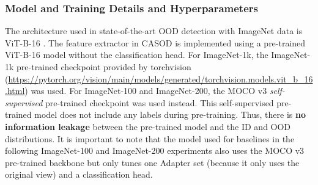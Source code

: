 %
\subsubsection{Model and Training Details and Hyperparameters}
The architecture used in state-of-the-art OOD detection with ImageNet data is ViT-B-16 \cite{dosovitskiy2020image}. The feature extractor in CASOD is implemented using a pre-trained ViT-B-16 model without the classification head. For ImageNet-1k, the ImageNet-1k pre-trained checkpoint provided by torchvision (\url{https://pytorch.org/vision/main/models/generated/torchvision.models.vit\_b\_16.html}) was used. For ImageNet-100 and ImageNet-200, the MOCO v3 \cite{chen2021empirical} \textit{self-supervised} pre-trained checkpoint was used instead. This self-supervised pre-trained model does not include any labels during pre-training. Thus, there is \textbf{no information leakage} between the pre-trained model and the ID and OOD distributions. It is important to note that the model used for baselines in the following ImageNet-100 and ImageNet-200 experiments also uses the MOCO v3 pre-trained backbone but only tunes one Adapter set (because it only uses the original view) and a classification head.


